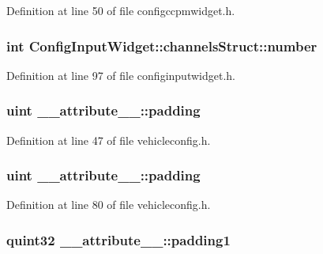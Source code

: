 \-Definition at line 50 of file configccpmwidget.\-h.

\hypertarget{group___config_plugin_gaba81d9d5d38874bfa4f1c91ec8ff6ec3}{
\subsubsection[{number}]{\setlength{\rightskip}{0pt plus 5cm}int \-Config\-Input\-Widget\-::channels\-Struct\-::number}}\label{group___config_plugin_gaba81d9d5d38874bfa4f1c91ec8ff6ec3}


\-Definition at line 97 of file configinputwidget.\-h.

\hypertarget{group___config_plugin_gae439ab85c005f3400498997049fd50e8}{
\subsubsection[{padding}]{\setlength{\rightskip}{0pt plus 5cm}uint {\bf \-\_\-\-\_\-attribute\-\_\-\-\_\-\-::padding}}}\label{group___config_plugin_gae439ab85c005f3400498997049fd50e8}


\-Definition at line 47 of file vehicleconfig.\-h.

\hypertarget{group___config_plugin_gae439ab85c005f3400498997049fd50e8}{
\subsubsection[{padding}]{\setlength{\rightskip}{0pt plus 5cm}uint {\bf \-\_\-\-\_\-attribute\-\_\-\-\_\-\-::padding}}}\label{group___config_plugin_gae439ab85c005f3400498997049fd50e8}


\-Definition at line 80 of file vehicleconfig.\-h.

\hypertarget{group___config_plugin_ga1d4a76a1f0c36316d50d1ae3f788ef4e}{
\subsubsection[{padding1}]{\setlength{\rightskip}{0pt plus 5cm}quint32 {\bf \-\_\-\-\_\-attribute\-\_\-\-\_\-\-::padding1}}}\label{group___config_plugin_ga1d4a76a1f0c36316d50d1ae3f788ef4e}


